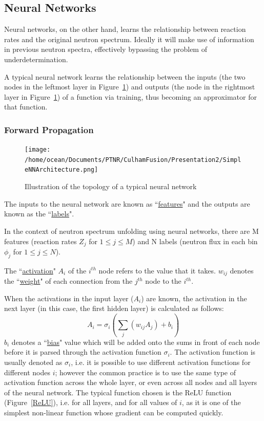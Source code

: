 \documentclass[a4paper, 12pt]{article}
\begin{document}
\subsection{Neural Networks} \label{Neural Network Theory}
Neural networks, on the other hand, learns the relationship between reaction rates and the original neutron spectrum. Ideally it will make use of information in previous neutron spectra, effectively bypassing the problem of underdetermination.

A typical neural network learns the relationship between the inputs (the two nodes in the leftmost layer in Figure~\ref{SimpleNNArchitecture}) and outputs (the node in the rightmost layer in Figure~\ref{SimpleNNArchitecture}) of a function via training, thus becoming an approximator for that function.

\subsubsection{Forward Propagation}
\begin{figure}[H]
    \centering
    \texttt{[image: /home/ocean/Documents/PTNR/CulhamFusion/Presentation2/SimpleNNArchitecture.png]}
    \caption{Illustration of the topology of a typical neural network} \label{SimpleNNArchitecture}
\end{figure}

The inputs to the neural network are known as ``\underline{features}" and the outputs are known as the ``\underline{labels}".

In the context of neutron spectrum unfolding using neural networks, there are M features (reaction rates $Z_j$ for $1\le j\le M$) and N labels (neutron flux in each bin $\phi_j$ for $1 \le j \le N$). 

The ``\underline{activation}" $A_i$ of the $i^{th}$ node refers to the value that it takes.
$w_{ij}$ denotes the ``\underline{weight}" of each connection from the $j^{th}$ node to the $i^{th}$.

When the activations in the input layer ($A_i$) are known, the activation in the next layer (in this case, the first hidden layer) is calculated as follows:
\begin{equation} \label{forwardpropagation}
    A_i = \sigma_i\left({\sum_{j} (w_{ij}A_j) + b_i}\right)
\end{equation}
$b_{i}$ denotes a ``\underline{bias}" value which will be added onto the sums in front of each node before it is parsed through the activation function $\sigma_i$.
The activation function is usually denoted as $\sigma_{i}$, i.e. it is possible to use different activation functions for different nodes $i$; however the common practice is to use the same type of activation function across the whole layer, or even across all nodes and all layers of the neural network. The typical function chosen is the ReLU function (Figure~\ref{ReLU}), i.e. for all layers, and for all values of $i$, as it is one of the simplest non-linear function whose gradient can be computed quickly.
\end{document}
